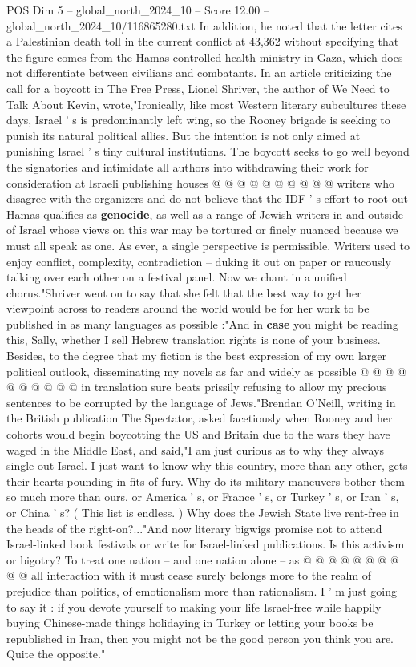 \begin{textsample}{POS Dim 5 – global\_north\_2024\_10 – Score 12.00 – global\_north\_2024\_10/116865280.txt}
In addition, he noted that the letter cites a Palestinian death toll in the current conflict at 43,362 without specifying that the figure comes from the Hamas-controlled health ministry in Gaza, which does not differentiate between civilians and combatants.
In an article criticizing the call for a boycott in The Free Press, Lionel Shriver, the author of We Need to Talk About Kevin, wrote,"Ironically, like most Western literary subcultures these days, Israel ' s is predominantly left wing, so the Rooney brigade is seeking to punish its natural political allies.
But the intention is not only aimed at punishing Israel ' s tiny cultural institutions.
The boycott seeks to go well beyond the signatories and intimidate all authors into withdrawing their work for consideration at Israeli publishing houses @ @ @ @ @ @ @ @ @ @ writers who disagree with the organizers and do not believe that the IDF ' s effort to root out Hamas qualifies as \textbf{genocide}, as well as a range of Jewish writers in and outside of Israel whose views on this war may be tortured or finely nuanced because we must all speak as one.
As ever, a single perspective is permissible.
Writers used to enjoy conflict, complexity, contradiction -- duking it out on paper or raucously talking over each other on a festival panel.
Now we chant in a unified chorus."Shriver went on to say that she felt that the best way to get her viewpoint across to readers around the world would be for her work to be published in as many languages as possible :"And in \textbf{case} you might be reading this, Sally, whether I sell Hebrew translation rights is none of your business.
Besides, to the degree that my fiction is the best expression of my own larger political outlook, disseminating my novels as far and widely as possible @ @ @ @ @ @ @ @ @ @ in translation sure beats prissily refusing to allow my precious sentences to be corrupted by the language of Jews."Brendan O'Neill, writing in the British publication The Spectator, asked facetiously when Rooney and her cohorts would begin boycotting the US and Britain due to the wars they have waged in the Middle East, and said,"I am just curious as to why they always single out Israel.
I just want to know why this country, more than any other, gets their hearts pounding in fits of fury.
Why do its military maneuvers bother them so much more than ours, or America ' s, or France ' s, or Turkey ' s, or Iran ' s, or China ' s? ( This list is endless. ) Why does the Jewish State live rent-free in the heads of the right-on?..."And now literary bigwigs promise not to attend Israel-linked book festivals or write for Israel-linked publications.
Is this activism or bigotry?
To treat one nation -- and one nation alone -- as @ @ @ @ @ @ @ @ @ @ all interaction with it must cease surely belongs more to the realm of prejudice than politics, of emotionalism more than rationalism.
I ' m just going to say it : if you devote yourself to making your life Israel-free while happily buying Chinese-made things holidaying in Turkey or letting your books be republished in Iran, then you might not be the good person you think you are.
Quite the opposite."


\end{textsample}

